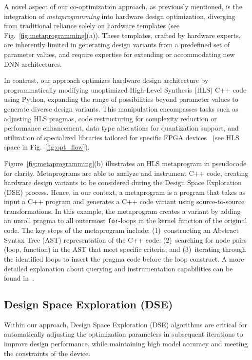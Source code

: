 A novel aspect of our co-optimization approach, as previously mentioned, is the integration of \textit{metaprogramming} into hardware design optimization, diverging from traditional reliance solely on hardware templates (see Fig.~\ref{fig:metaprogramming}(a)). These templates, crafted by hardware experts, are inherently limited in generating design variants from a predefined set of parameter values, and require expertise for extending or accommodating new DNN architectures.

In contrast, our approach optimizes hardware design architecture by programmatically modifying unoptimized High-Level Synthesis (HLS) C++ code using Python, expanding the range of possibilities beyond parameter values to generate diverse design variants. This manipulation encompasses tasks such as adjusting HLS pragmas, code restructuring for complexity reduction or performance enhancement, data type alterations for quantization support, and utilization of specialized libraries tailored for specific FPGA devices~\cite{fccm20_artisan} (see HLS space in Fig.~\ref{fig:opt_flow}).

Figure~\ref{fig:metaprogramming}(b) illustrates an HLS metaprogram in pseudocode for clarity. Metaprograms are able to analyze and instrument C++ code, creating hardware design variants to be considered during the Design Space Exploration (DSE) process. Hence, in our context, a metaprogram is a program that takes as input a C++ program and generates a C++ code variant using source-to-source transformations.  In this example, the metaprogram creates a variant by adding an unroll pragma to all outermost \texttt{for}-loops in the kernel function of the original code. The key steps of the metaprogram include: (1)~constructing an Abstract Syntax Tree (AST) representation of the C++ code; (2)~searching for node pairs (loop, function) in the AST that meet specific criteria; and (3)~iterating through the identified loops to insert the pragma code before the loop construct. A more detailed explanation about querying and instrumentation capabilities can be found in~\cite{fccm20_artisan}. 


\subsection{Design Space Exploration (DSE)}
Within our approach, Design Space Exploration (DSE) algorithms are critical for automatically adjusting the optimization parameters in subsequent iterations to improve design performance, while maintaining high model accuracy and meeting the constraints of the device. 

